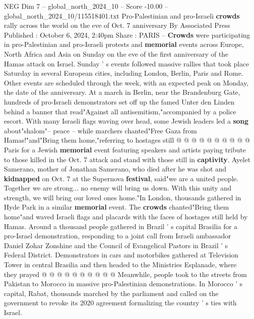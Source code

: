 \begin{textsample}{NEG Dim 7 – global\_north\_2024\_10 – Score -10.00 – global\_north\_2024\_10/115518401.txt}  \label{ex:f7_neg_038}
Pro-Palestinian and pro-Israeli \textbf{crowds} rally across the world on the eve of Oct. 7 anniversary By Associated Press Published : October 6, 2024, 2:40pm Share : PARIS -- \textbf{Crowds} were participating in pro-Palestinian and pro-Israeli protests and \textbf{memorial} events across Europe, North Africa and Asia on Sunday on the eve of the first anniversary of the Hamas attack on Israel.
Sunday ' s events followed massive rallies that took place Saturday in several European cities, including London, Berlin, Paris and Rome.
Other events are scheduled through the week, with an expected peak on Monday, the date of the anniversary.
At a march in Berlin, near the Brandenburg Gate, hundreds of pro-Israeli demonstrators set off up the famed Unter den Linden behind a banner that read"Against all antisemitism,"accompanied by a police escort.
With many Israeli flags waving over head, some Jewish leaders led a \textbf{song} about"shalom"-- peace -- while marchers chanted"Free Gaza from Hamas!"and"Bring them home,"referring to hostages still @ @ @ @ @ @ @ @ @ @ Paris for a Jewish \textbf{memorial} event featuring speakers and artists paying tribute to those killed in the Oct. 7 attack and stand with those still in \textbf{captivity}.
Ayelet Samerano, mother of Jonathan Samerano, who died after he was shot and \textbf{kidnapped} on Oct. 7 at the Supernova \textbf{festival}, said"we are a united people.
Together we are strong... no enemy will bring us down.
With this unity and strength, we will bring our loved ones home."In London, thousands gathered in Hyde Park in a similar \textbf{memorial} event.
The \textbf{crowds} chanted"Bring them home"and waved Israeli flags and placards with the faces of hostages still held by Hamas.
Around a thousand people gathered in Brazil ' s capital Brasilia for a pro-Israel demonstration, responding to a joint call from Israeli ambassador Daniel Zohar Zonshine and the Council of Evangelical Pastors in Brazil ' s Federal District.
Demonstrators in cars and motorbikes gathered at Television Tower in central Brasilia and then headed to the Ministries Esplanade, where they prayed @ @ @ @ @ @ @ @ @ @ Meanwhile, people took to the streets from Pakistan to Morocco in massive pro-Palestinian demonstrations.
In Morocco ' s capital, Rabat, thousands marched by the parliament and called on the government to revoke its 2020 agreement formalizing the country ' s ties with Israel.

\end{textsample}
